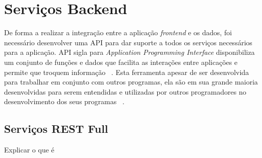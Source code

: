 \section{Serviços Backend}

De forma a realizar a integração entre a aplicação \emph{frontend} e os dados, foi necessário desenvolver uma API para dar suporte a todos os serviços necessários para a aplicação.
API sigla para \emph{Application Programming Interface} disponibiliza um conjunto de funções e dados que facilita as interações entre aplicações e permite que troquem informação ~\cite{rest_cookbook}.
Esta ferramenta apesar de ser desenvolvida para trabalhar em conjunto com outros programas, ela são em sua grande maioria desenvolvidas para serem entendidas e utilizadas por outros programadores no
desenvolvimento dos seus programas ~\cite{api_design}.

\subsection{Serviços REST Full}
Explicar o que é